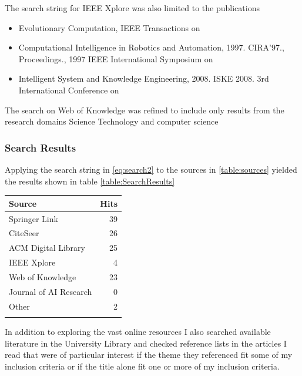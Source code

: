 \documentclass[a4paper]{book}
\begin{document}
The search string for IEEE Xplore was also limited to the publications


\begin{itemize}
\item{ Evolutionary Computation, IEEE Transactions on}
\item{Computational Intelligence in Robotics and Automation, 1997. CIRA'97., Proceedings., 1997 IEEE International Symposium on}
\item{Intelligent System and Knowledge Engineering, 2008. ISKE 2008. 3rd International Conference on}
\end{itemize}
The search on Web of Knowledge was refined to include only results from the research domains Science Technology and computer science
\subsubsection{Search Results}

Applying the search string in \ref{eq:search2} to the sources in \ref{table:sources} yielded the results shown in table \ref{table:SearchResults}

\begin{center}
    \begin{tabular}{|l|r|}
    \hline
	Source				& Hits 	\\ \hline
	Springer Link 			& 39 	\\ \hline
	CiteSeer    			& 26 \\ \hline
    	ACM Digital Library 		& 25 \\ \hline
    	IEEE Xplore 			& 4  \\ \hline
	Web of Knowledge 		& 23 \\ \hline
    	Journal of AI Research 		& 0 	\\ \hline
	Other  				& 2 \\ 
    \hline
     \label{table:SearchResults}
   \end{tabular}
\end{center}

In addition to exploring the vast online resources I also searched available literature in the University Library and checked reference lists 
in the articles I read that were of particular interest if the theme they referenced fit some of my inclusion criteria or if the title alone fit one or more of my inclusion criteria.

\end{document}
